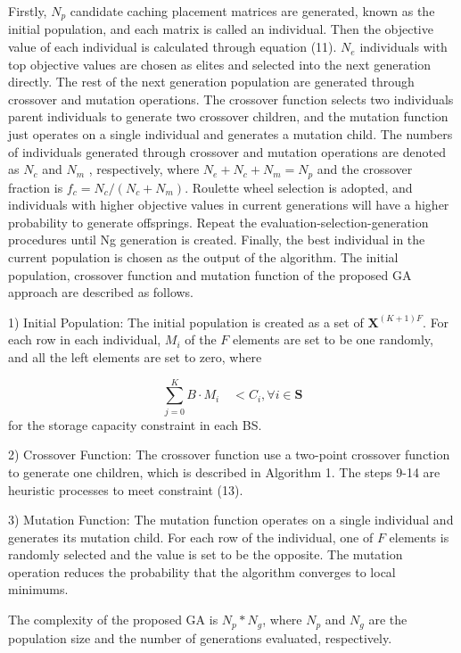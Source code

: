\documentclass[conference]{IEEEtran}
\begin{document}
Firstly, $N_p$ candidate caching placement matrices are generated, known as the initial population, and each matrix is called an individual. Then the objective value of each individual is calculated through equation (11). $N_e$ individuals with top objective values are chosen as elites and selected into the next generation directly. The rest of the next generation population are generated through crossover and mutation operations. The crossover function selects two individuals parent individuals to generate two crossover children, and the mutation function just operates on a single individual and generates a mutation child. The numbers of individuals generated through crossover and mutation operations are denoted as $N_c$ and $N_m$ , respectively, where $N_e+N_c+N_m=N_p$ and the crossover fraction is $f_c=N_c/ (N_c+N_m)$. Roulette wheel selection is adopted, and individuals with higher objective values in current generations will have a higher probability to generate offsprings. Repeat the evaluation-selection-generation procedures until Ng generation is created. Finally, the best individual in the current population is chosen as the output of the algorithm. The initial population, crossover function and mutation function of the proposed GA approach are described as follows.

1)	Initial Population: The initial population is created as a set of $\mathbf{X}^{(K+1)F}$. For each row in each individual, $M_i$ of the $F$ elements are set to be one randomly, and all the left elements are set to zero, where

\begin{equation}
\sum_{j=0}^K B\cdot M_i \quad<C_i, \forall{i}\in\mathbf{S}
\end{equation}
for the storage capacity constraint in each BS.

2)	Crossover Function: The crossover function use a two-point crossover function to generate one children, which is described in Algorithm 1. The steps 9-14 are heuristic processes to meet constraint (13).

3)	Mutation Function: The mutation function operates on a single individual and generates its mutation child. For each row of the individual, one of $F$ elements is randomly selected and the value is set to be the opposite. The mutation operation reduces the probability that the algorithm converges to local minimums.

The complexity of the proposed GA is $N_p\ast N_g$, where $ N_p$ and $N_g$ are the population size and the number of generations evaluated, respectively.
\end{document}

